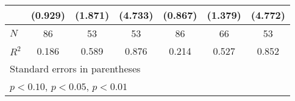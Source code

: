 {\begin{tabular}{l*{6}{c}}
            &     (0.929)         &     (1.871)         &     (4.733)         &     (0.867)         &     (1.379)         &     (4.772)         \\
\hline
\(N\)       &          86         &          53         &          53         &          86         &          66         &          53         \\
\(R^{2}\)   &       0.186         &       0.589         &       0.876         &       0.214         &       0.527         &       0.852         \\
\hline\hline
\multicolumn{7}{l}{\footnotesize Standard errors in parentheses}\\
\multicolumn{7}{l}{\footnotesize \sym{*} \(p<0.10\), \sym{**} \(p<0.05\), \sym{***} \(p<0.01\)}\\
\end{tabular}
}
